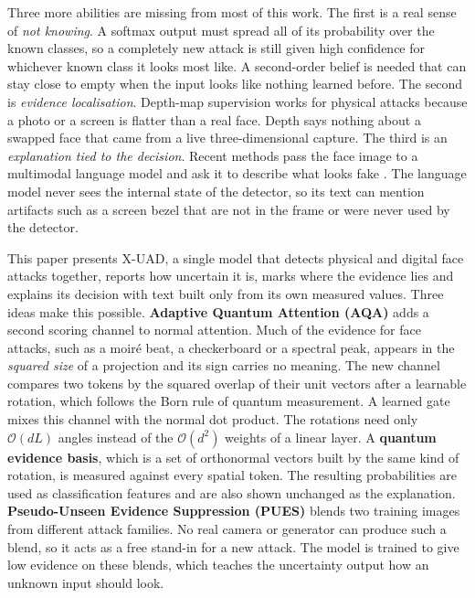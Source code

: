 \documentclass[conference]{IEEEtran}
\begin{document}
Three more abilities are missing from most of this work. The first is a real sense of
\emph{not knowing}. A softmax output must spread all of its probability over the known
classes, so a completely new attack is still given high confidence for whichever
known class it looks most like. A second-order belief is needed that can stay close
to empty when the input looks like nothing learned before. The second is \emph{evidence
localisation}. Depth-map supervision \cite{liu2018auxiliary,yu2021revisiting} works
for physical attacks because a photo or a screen is flatter than a real face. Depth
says nothing about a swapped face that came from a live three-dimensional capture.
The third is an \emph{explanation tied to the decision}. Recent methods pass the face
image to a multimodal language model and ask it to describe what looks fake
\cite{huang2024ffaa,guo2025m2f2det}. The language model never sees the internal state
of the detector, so its text can mention artifacts such as a screen bezel that are
not in the frame or were never used by the detector.

This paper presents X-UAD, a single model that detects physical and digital face
attacks together, reports how uncertain it is, marks where the evidence lies and
explains its decision with text built only from its own measured values. Three ideas
make this possible. \textbf{Adaptive Quantum Attention (AQA)} adds a second scoring
channel to normal attention. Much of the evidence for face attacks, such as a moir\'e
beat, a checkerboard or a spectral peak, appears in the \emph{squared size} of a
projection and its sign carries no meaning. The new channel compares two tokens by the
squared overlap of their unit vectors after a learnable rotation, which follows the
Born rule of quantum measurement. A learned gate mixes this channel with the normal
dot product. The rotations need only $\mathcal{O}(dL)$ angles instead of the
$\mathcal{O}(d^{2})$ weights of a linear layer. A \textbf{quantum evidence basis}, which
is a set of orthonormal vectors built by the same kind of rotation, is measured
against every spatial token. The resulting probabilities are used as classification
features and are also shown unchanged as the explanation. \textbf{Pseudo-Unseen
Evidence Suppression (PUES)} blends two training images from different attack
families. No real camera or generator can produce such a blend, so it acts as a free
stand-in for a new attack. The model is trained to give low evidence on these blends,
which teaches the uncertainty output how an unknown input should look.
\end{document}
